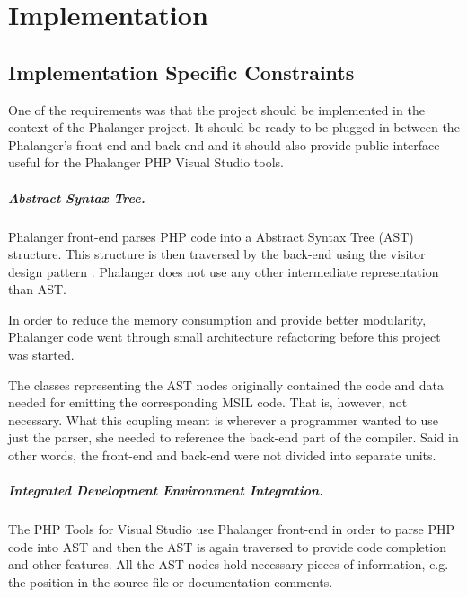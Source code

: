 \chapter{Implementation}

    \section{Implementation Specific Constraints}
    
    One of the requirements was that the project should be implemented 
    in the context of the Phalanger project. It should be ready 
    to be plugged in between the Phalanger's front-end and back-end and 
    it should also provide public interface useful for the 
    Phalanger PHP Visual Studio tools.
    
    \paragraph{Abstract Syntax Tree.} Phalanger front-end parses PHP code 
    into a Abstract Syntax Tree (AST) \cite{aho1985compilers} structure. 
    This structure is then traversed by the back-end using the 
    visitor design pattern \cite{gamma1994design}. Phalanger does not 
    use any other intermediate representation than AST.
    
    In order to reduce the memory consumption and provide better 
    modularity, Phalanger code went through small architecture 
    refactoring before this project was started. 
    
    The classes representing the AST nodes originally contained 
    the code and data needed for emitting the corresponding MSIL code. 
    That is, however, not necessary.
    What this coupling meant is wherever a programmer wanted 
    to use just the parser, she needed to reference the 
    back-end part of the compiler. Said in other words, the 
    front-end and back-end were not divided into separate units.
    
    \paragraph{Integrated Development Environment Integration.}
    The PHP Tools for Visual Studio use Phalanger front-end in order to 
    parse PHP code into AST and then the AST is again traversed to provide 
    code completion and other features. All the AST nodes hold necessary 
    pieces of information, e.g. the position in the source file or 
    documentation comments.
    
